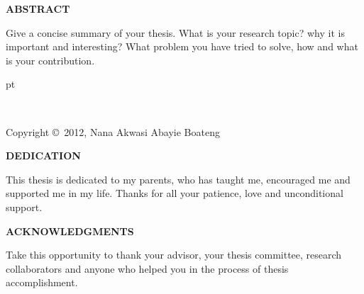 \documentclass[12pt]{article}
\numberwithin{equation}{section} %
\begin{document}
\newpage
\begin{center}
{\bf ABSTRACT}\\
\end{center}
\baselineskip=24pt


Give a concise summary of your thesis. What is your research topic?
why it is important and interesting? What problem you have tried to
solve, how and what is your contribution.

\newpage
{} pt
\begin{center}
\ \ \
\vspace{3.in}

Copyright \copyright\ 2012, Nana Akwasi Abayie Boateng
\end{center}


\newpage

\begin{center}

{ \bf DEDICATION } \\ [.15in]
\end{center}

This thesis is dedicated to my parents, who has taught me,
encouraged me and supported me in my life. Thanks for all your
patience, love and unconditional support.


\newpage
\begin{center}

{ \bf ACKNOWLEDGMENTS} \\ [.15in]
\end{center}

Take this opportunity to thank your advisor, your thesis committee,
research collaborators and anyone who helped you in the process of
thesis accomplishment.




\newpage
\end{document}
